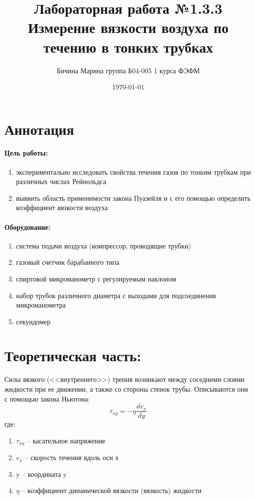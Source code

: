 \documentclass[a4paper,12pt]{article}
\author{Бичина Марина 
группа Б04-005 1 курса ФЭФМ}
\title{Лабораторная работа №1.3.3 \\ Измерение вязкости воздуха по течению в тонких трубках}
\date{\today}
\begin{document}

\maketitle
\newpage

\section{Аннотация}

\paragraph{Цель работы:} 
\begin{enumerate}
\itemsep0em
\item 
экспериментально исследовать свойства течения газов по тонким трубкам при различных числах Рейнольдса
\item 
 выявить область применимости закона Пуазейля и с его помощью определить коэффициент вязкости воздуха 
\end{enumerate}
\paragraph{Оборудование:}
\begin{enumerate}
\itemsep0em
\item 
система подачи воздуха (компрессор, проводящие трубки)
\item
газовый счетчик барабанного типа
\item
спиртовой микроманометр с регулируемым наклоном
\item
 набор трубок различного диаметра с выходами для подсоединения микроманометра
\item
  секундомер
\end{enumerate}
\section{Теоретическая часть:}
\paragraph{}
Силы вязкого (<<внутреннего>>) трения возникают между соседними слоями жидкости при ее движении, а также со стороны стенок трубы. Описываются они с помощью закона Ньютона:
\begin{equation}
\tau_{xy} = -\eta \frac{dv_{x}}{dy}
\end{equation}
где:
\begin{enumerate}
\itemsep0em
\item $\tau_{xy}$ -- касательное напряжение
\item $v_{x}$ -- скорость течения вдоль оси х
\item y -- координата y  
\item $\eta$ -- коэффициент динамической вязкости (вязкость) жидкости
\end{enumerate}
\end{document}

